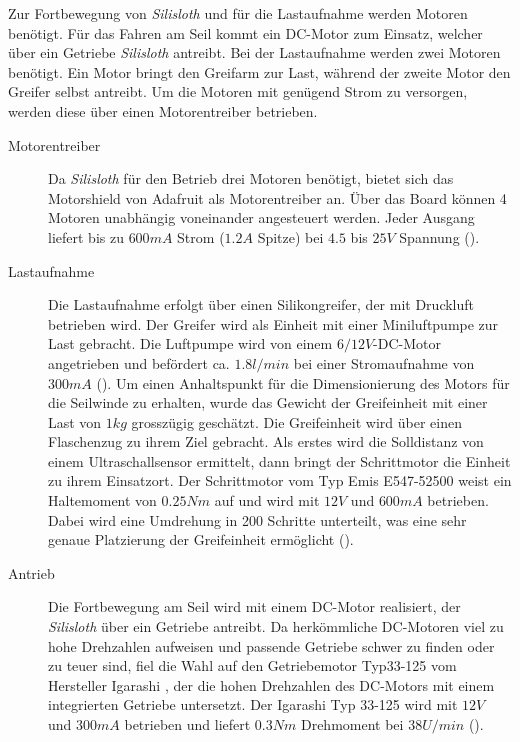 Zur Fortbewegung von \textit{Silisloth} und für die Lastaufnahme werden Motoren benötigt. Für das Fahren am Seil kommt ein DC-Motor zum Einsatz, welcher über ein Getriebe \textit{Silisloth} antreibt. Bei der Lastaufnahme werden zwei Motoren benötigt. Ein Motor bringt den Greifarm zur Last, während der zweite Motor den Greifer selbst antreibt. Um die Motoren mit genügend Strom zu versorgen, werden diese über einen Motorentreiber betrieben.

\begin{description}
\item[Motorentreiber] Da \textit{Silisloth} für den Betrieb drei Motoren benötigt, bietet sich das Motorshield von Adafruit  als Motorentreiber an. Über das Board können 4 Motoren unabhängig voneinander angesteuert werden. Jeder Ausgang liefert bis zu $600mA$ Strom ($1.2A$ Spitze) bei $4.5$ bis $25V$ Spannung ().
\item[Lastaufnahme] Die Lastaufnahme erfolgt über einen Silikongreifer, der mit Druckluft betrieben wird. Der Greifer wird als Einheit mit einer Miniluftpumpe  zur Last gebracht. Die Luftpumpe wird von einem $6/12V$-DC-Motor angetrieben und befördert ca. $1.8l/min$ bei einer Stromaufnahme von $300mA$ (). Um einen Anhaltspunkt für die Dimensionierung des Motors für die Seilwinde zu erhalten, wurde das Gewicht der Greifeinheit mit einer Last von $1kg$ grosszügig geschätzt. Die Greifeinheit wird über einen Flaschenzug zu ihrem Ziel gebracht. Als erstes wird die Solldistanz von einem Ultraschallsensor ermittelt, dann bringt der Schrittmotor die Einheit zu ihrem Einsatzort. Der Schrittmotor vom Typ Emis E547-52500  weist ein Haltemoment von $0.25Nm$ auf und wird mit $12V$ und $600mA$ betrieben. Dabei wird eine Umdrehung in 200 Schritte unterteilt, was eine sehr genaue Platzierung der Greifeinheit ermöglicht ().
\item[Antrieb] Die Fortbewegung am Seil wird mit einem DC-Motor realisiert, der \textit{Silisloth} über ein Getriebe antreibt. Da herkömmliche DC-Motoren viel zu hohe Drehzahlen aufweisen und passende Getriebe schwer zu finden oder zu teuer sind, fiel die Wahl auf den Getriebemotor Typ33-125 vom Hersteller Igarashi , der die hohen Drehzahlen des DC-Motors mit einem integrierten Getriebe untersetzt. Der Igarashi Typ 33-125 wird mit $12V$ und $300mA$ betrieben und liefert $0.3Nm$ Drehmoment bei $38 U/min$ (). 
\end{description}

